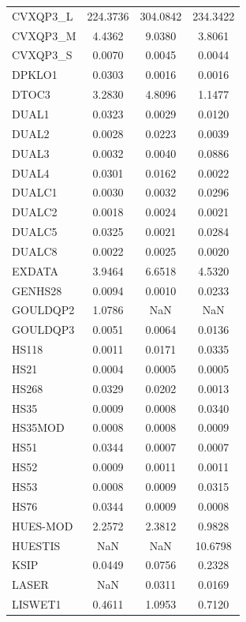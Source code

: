 \begin{longtable}{lccc}
CVXQP3\_L & 224.3736 & 304.0842 & 234.3422 \\
CVXQP3\_M &   4.4362 &   9.0380 &   3.8061 \\
CVXQP3\_S &   0.0070 &   0.0045 &   0.0044 \\
DPKLO1   &   0.0303 &   0.0016 &   0.0016 \\
DTOC3    &   3.2830 &   4.8096 &   1.1477 \\
DUAL1    &   0.0323 &   0.0029 &   0.0120 \\
DUAL2    &   0.0028 &   0.0223 &   0.0039 \\
DUAL3    &   0.0032 &   0.0040 &   0.0886 \\
DUAL4    &   0.0301 &   0.0162 &   0.0022 \\
DUALC1   &   0.0030 &   0.0032 &   0.0296 \\
DUALC2   &   0.0018 &   0.0024 &   0.0021 \\
DUALC5   &   0.0325 &   0.0021 &   0.0284 \\
DUALC8   &   0.0022 &   0.0025 &   0.0020 \\
EXDATA   &   3.9464 &   6.6518 &   4.5320 \\
GENHS28  &   0.0094 &   0.0010 &   0.0233 \\
GOULDQP2 &   1.0786 &      NaN &      NaN \\
GOULDQP3 &   0.0051 &   0.0064 &   0.0136 \\
HS118    &   0.0011 &   0.0171 &   0.0335 \\
HS21     &   0.0004 &   0.0005 &   0.0005 \\
HS268    &   0.0329 &   0.0202 &   0.0013 \\
HS35     &   0.0009 &   0.0008 &   0.0340 \\
HS35MOD  &   0.0008 &   0.0008 &   0.0009 \\
HS51     &   0.0344 &   0.0007 &   0.0007 \\
HS52     &   0.0009 &   0.0011 &   0.0011 \\
HS53     &   0.0008 &   0.0009 &   0.0315 \\
HS76     &   0.0344 &   0.0009 &   0.0008 \\
HUES-MOD &   2.2572 &   2.3812 &   0.9828 \\
HUESTIS  &      NaN &      NaN &  10.6798 \\
KSIP     &   0.0449 &   0.0756 &   0.2328 \\
LASER    &      NaN &   0.0311 &   0.0169 \\
LISWET1  &   0.4611 &   1.0953 &   0.7120 \\

\end{longtable}
